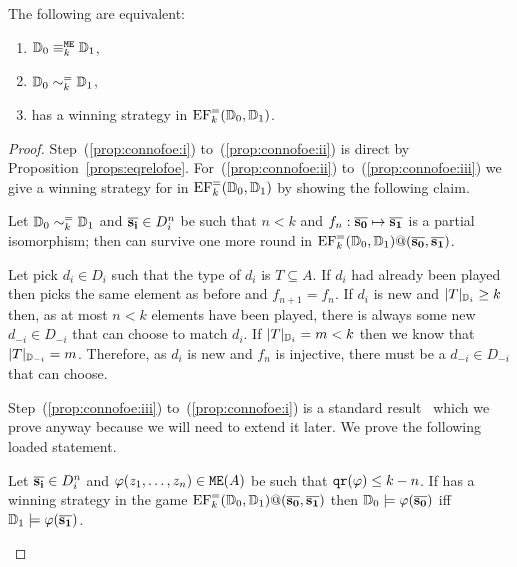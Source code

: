 \begin{proposition}\label{prop:connofoe}
The following are equivalent:
\begin{enumerate}
 pt  pt
\item\label{prop:connofoe:i} $\mathbb{D}_0 \equiv_k^{\mathtt{M}\mathtt{E}} \mathbb{D}_1$,
\item\label{prop:connofoe:ii} $\mathbb{D}_0 \sim_k^= \mathbb{D}_1$,
\item\label{prop:connofoe:iii} \eloise has a winning strategy in 
   $\mathrm{EF}_k^=(\mathbb{D}_0,\mathbb{D}_1)$.
	\end{enumerate}
\end{proposition}
\begin{proof}
Step~(\ref{prop:connofoe:i}) to~(\ref{prop:connofoe:ii}) is direct by
Proposition~\ref{props:eqrelofoe}. 
For~(\ref{prop:connofoe:ii}) to~(\ref{prop:connofoe:iii}) we give a winning 
strategy for \eloise in $\mathrm{EF}_k^=(\mathbb{D}_0,\mathbb{D}_1)$ by showing the 
following claim.
\begin{claimfirst}
Let $\mathbb{D}_0 \sim_k^= \mathbb{D}_1$ and $\overline{{\mathbf{s_i}}} \in D_i^n$ be such that
$n<k$ and $f_n:\overline{{\mathbf{s_0}}}\mapsto\overline{{\mathbf{s_1}}}$ is a partial isomorphism; then 
\eloise can survive one more round in 
$\mathrm{EF}_{k}^=(\mathbb{D}_0,\mathbb{D}_1)@(\overline{{\mathbf{s_0}}},\overline{{\mathbf{s_1}}})$.
\end{claimfirst}

\begin{pfclaim}
Let \abelard pick $d_i\in D_i$ such that the type of $d_i$ is $T \subseteq A$. 
If $d_i$ had already been played then \eloise picks the same element as before
and $f_{n+1} = f_n$.
If $d_i$ is new and $|T|_{\mathbb{D}_i} \geq k$ then, as at most $n<k$ elements 
have been played, there is always some new $d_{-i} \in D_{-i}$ that \eloise can 
choose to match $d_i$. 
If $|T|_{\mathbb{D}_i} = m < k$ then we know that $|T|_{\mathbb{D}_{-i}} = m$. 
Therefore, as $d_i$ is new and $f_n$ is injective, there must be a $d_{-i} \in 
D_{-i}$ that \eloise can choose. 
\end{pfclaim}
	
Step~(\ref{prop:connofoe:iii}) to~(\ref{prop:connofoe:i}) is a standard
result~\cite[Corollary 2.2.9]{fmt} which we prove anyway because we will need 
to extend it later. 
We prove the following loaded statement.
\begin{claim}
Let $\overline{{\mathbf{s_i}}} \in D_i^n$ and $\varphi(z_1,\dots,z_n) \in \mathtt{M}\mathtt{E}(A)$ be such 
that $\mathtt{qr}(\varphi) \leq k-n$. 
If \eloise has a winning strategy in the game 
$\mathrm{EF}_k^=(\mathbb{D}_0,\mathbb{D}_1)@(\overline{{\mathbf{s_0}}},\overline{{\mathbf{s_1}}})$ then 
$\mathbb{D}_0 \models \varphi(\overline{{\mathbf{s_0}}})$ iff 
$\mathbb{D}_1 \models \varphi(\overline{{\mathbf{s_1}}})$.
\end{claim}
	

\end{proof}
